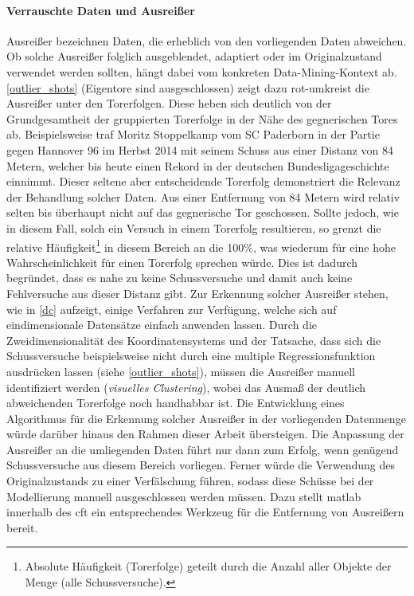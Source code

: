 \paragraph{Verrauschte Daten und Ausreißer}
Ausreißer bezeichnen Daten, die erheblich von den vorliegenden Daten abweichen. Ob solche Ausreißer folglich ausgeblendet, adaptiert oder im Originalzustand verwendet werden sollten, hängt dabei vom konkreten Data-Mining-Kontext ab. \vref{outlier_shots} (Eigentore sind ausgeschlossen) zeigt dazu rot-umkreist die Ausreißer unter den Torerfolgen. Diese 	 heben sich deutlich von der Grundgesamtheit der gruppierten Torerfolge in der Nähe des gegnerischen Tores ab. Beispielsweise traf Moritz Stoppelkamp vom SC Paderborn in der Partie gegen Hannover 96 im Herbst 2014 mit seinem Schuss aus einer Distanz von 84 Metern, welcher bis heute einen Rekord in der deutschen Bundesligageschichte einnimmt. Dieser seltene aber entscheidende Torerfolg demonstriert die Relevanz der Behandlung solcher Daten. Aus einer Entfernung von 84 Metern wird relativ selten bis überhaupt nicht auf das gegnerische Tor geschossen. Sollte jedoch, wie in diesem Fall, solch ein Versuch in einem Torerfolg resultieren, so grenzt die relative Häufigkeit\footnote{Absolute Häufigkeit (Torerfolge) geteilt durch die Anzahl aller Objekte der Menge (alle Schussversuche).} in diesem Bereich an die 100\%, was wiederum für eine hohe Wahrscheinlichkeit für einen Torerfolg sprechen würde. Dies ist dadurch begründet, dass es nahe zu keine Schussversuche und damit auch keine Fehlversuche aus dieser Distanz gibt. Zur Erkennung solcher Ausreißer stehen, wie in \vref{dc} aufzeigt, einige Verfahren zur Verfügung, welche sich auf eindimensionale Datensätze einfach anwenden lassen. Durch die Zweidimensionalität des Koordinatensystems und der Tatsache, dass sich die Schussversuche beispielsweise nicht durch eine multiple Regressionsfunktion ausdrücken lassen (siehe \vref{outlier_shots}), müssen die Ausreißer manuell identifiziert werden (\textit{visuelles Clustering}), wobei das Ausmaß der deutlich abweichenden Torerfolge noch handhabbar ist. Die Entwicklung eines Algorithmus für die Erkennung solcher Ausreißer in der vorliegenden Datenmenge würde darüber hinaus den Rahmen dieser Arbeit übersteigen. Die Anpassung der Ausreißer an die umliegenden Daten führt nur dann zum Erfolg, wenn genügend Schussversuche aus diesem Bereich vorliegen. Ferner würde die Verwendung des Originalzustands zu einer Verfälschung führen, sodass diese Schüsse bei der Modellierung manuell ausgeschlossen werden müssen. Dazu stellt \gls{matlab} innerhalb des \gls{cft} ein entsprechendes Werkzeug für die Entfernung von Ausreißern bereit.

